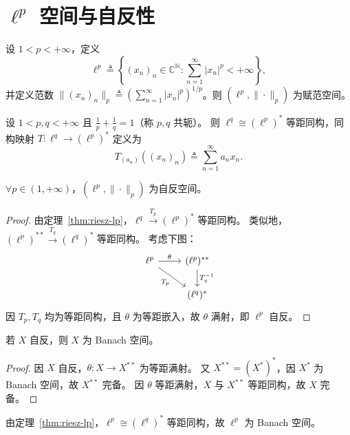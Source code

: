 \documentclass[lang=cn,a4paper,newtx,section]{elegantbook}
\begin{document}
\section{$\ell^p$ 空间与自反性}

\begin{definition}[$\ell^p$ 空间]
  设 $1<p<+\infty$，定义
  \[
    \ell^p\triangleq\left\{(x_n)_n\in\mathbb{C}^{\mathbb{N}}:\sum_{n=1}^{\infty}|x_n|^p<+\infty\right\},
  \]
  并定义范数 $\|(x_n)_n\|_p\triangleq\left(\sum_{n=1}^{\infty}|x_n|^p\right)^{1/p}$。则 $(\ell^p,\|\cdot\|_p)$ 为赋范空间。
\end{definition}

\begin{theorem}\label{thm:riesz-lp}
  设 $1<p,q<+\infty$ 且 $\frac{1}{p}+\frac{1}{q}=1$（称 $p,q$ 共轭）。
  则 $\ell^q\cong(\ell^p)^*$ 等距同构，同构映射 $T:\ell^q\to(\ell^p)^*$ 定义为
  \[
    T_{(a_n)}((x_n)_n)\triangleq\sum_{n=1}^{\infty}a_n x_n.
  \]
\end{theorem}

\begin{theorem}
  $\forall p\in(1,+\infty)$，$(\ell^p,\|\cdot\|_p)$ 为自反空间。
\end{theorem}

\begin{proof}
  由定理~\ref{thm:riesz-lp}，$\ell^q\xrightarrow{T_p}(\ell^p)^*$ 等距同构。
  类似地，$(\ell^p)^{**}\xrightarrow{T_q}(\ell^q)^*$ 等距同构。
  考虑下图：
  \[
    \begin{tikzcd}
      \ell^p \arrow[r,"\theta"] \arrow[dr,"T_p"'] & (\ell^p)^{**} \arrow[d,"T_q^{-1}"] \\
      & (\ell^q)^*
    \end{tikzcd}
  \]
  因 $T_p,T_q$ 均为等距同构，且 $\theta$ 为等距嵌入，故 $\theta$ 满射，即 $\ell^p$ 自反。
\end{proof}

\begin{proposition}
  若 $X$ 自反，则 $X$ 为 Banach 空间。
\end{proposition}

\begin{proof}
  因 $X$ 自反，$\theta:X\to X^{**}$ 为等距满射。
  又 $X^{**}=(X^*)^*$，因 $X^*$ 为 Banach 空间，故 $X^{**}$ 完备。
  因 $\theta$ 等距满射，$X$ 与 $X^{**}$ 等距同构，故 $X$ 完备。
\end{proof}

\begin{remark}
  由定理~\ref{thm:riesz-lp}，$\ell^p\cong(\ell^q)^*$ 等距同构，故 $\ell^p$ 为 Banach 空间。
\end{remark}
\end{document}
